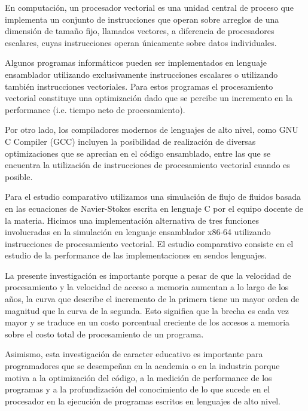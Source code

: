 En computación, un procesador vectorial es una unidad central de proceso que implementa un conjunto de instrucciones que operan sobre arreglos de una dimensión de tamaño fijo, llamados vectores, a diferencia de procesadores escalares, cuyas instrucciones operan únicamente sobre datos individuales.
\par Algunos programas informáticos pueden ser implementados en lenguaje ensamblador utilizando exclusivamente instrucciones escalares o utilizando también instrucciones vectoriales. Para estos programas el procesamiento vectorial constituye una optimización dado que se percibe un incremento en la performance (i.e. tiempo neto de procesamiento).
\par Por otro lado, los compiladores modernos de lenguajes de alto nivel, como GNU C Compiler (GCC) incluyen la posibilidad de realización de diversas optimizaciones que se aprecian en el código ensamblado, entre las que se encuentra la utilización de instrucciones de procesamiento vectorial cuando es posible.
\par Para el estudio comparativo utilizamos una simulación de flujo de fluidos basada en las ecuaciones de Navier-Stokes escrita en lenguaje C por el equipo docente de la materia. Hicimos una implementación alternativa de tres funciones involucradas en la simulación en lenguaje ensamblador x86-64 utilizando instrucciones de procesamiento vectorial. El estudio comparativo consiste en el estudio de la performance de las implementaciones en sendos lenguajes.
\par La presente investigación es importante porque a pesar de que la velocidad de procesamiento y la velocidad de acceso a memoria aumentan a lo largo de los años, la curva que describe el incremento de la primera tiene un mayor orden de magnitud que la curva de la segunda. Esto significa que la brecha es cada vez mayor y se traduce en un costo porcentual creciente de los accesos a memoria sobre el costo total de procesamiento de un programa.
\par Asimismo, esta investigación de caracter educativo es importante para programadores que se desempeñan en la academia o en la industria porque motiva a la optimización del código, a la medición de performance de los programas y a la profundización del conocimiento de lo que sucede en el procesador en la ejecución de programas escritos en lenguajes de alto nivel.